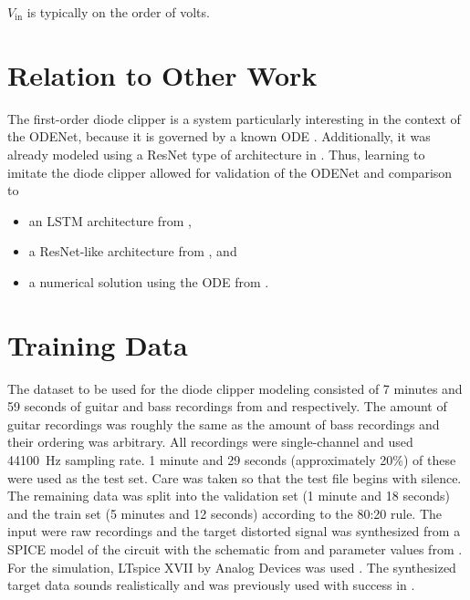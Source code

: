 $V_\text{in}$ is typically on the order of volts.

\section{Relation to Other Work}

The first-order diode clipper is a system particularly interesting in the context of the ODENet, because it is governed by a known \ac{ODE} \cite{Yeh2007,Yeh2008}. Additionally, it was already modeled using a \ac{ResNet} type of architecture in \cite{Parker2019}. Thus, learning to imitate the diode clipper allowed for validation of the ODENet and comparison to 
\begin{itemize}
    \item an \ac{LSTM} architecture from \cite{Wrightetal2020},
    \item a \ac{ResNet}-like architecture from \cite{Parker2019}, and
    \item a numerical solution using the \ac{ODE} from \cite{Yeh2007,Yeh2008}.
\end{itemize}

\section{Training Data}
\label{sec:diode_clipper_training_data}

The dataset to be used for the diode clipper modeling consisted of 7 minutes and 59 seconds of guitar and bass recordings from \cite{Abesser2013} and \cite{Kehling2014} respectively. The amount of guitar recordings was roughly the same as the amount of bass recordings and their ordering was arbitrary. All recordings were single-channel and used \SI{44100}{Hz} sampling rate. 1 minute and 29 seconds (approximately 20\%) of these were used as the test set. Care was taken so that the test file begins with silence. The remaining data was split into the validation set (1 minute and 18 seconds) and the train set (5 minutes and 12 seconds) according to the 80:20 rule. The input were raw recordings and the target distorted signal was synthesized from a SPICE model of the circuit with the schematic from  and parameter values from . For the simulation, LTspice XVII by Analog Devices was used \cite{LTspice}. The synthesized target data sounds realistically and was previously used with success in \cite{Wright2019}.

